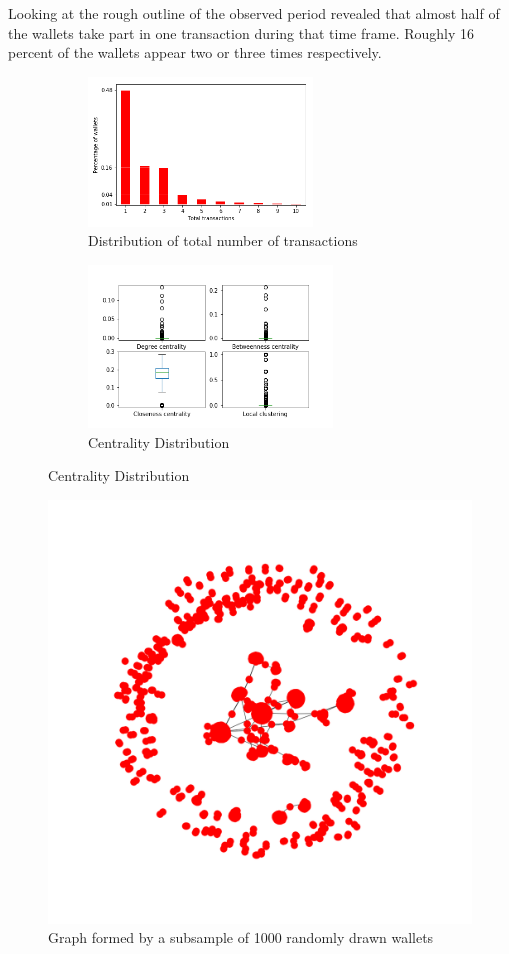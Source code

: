 Looking at the rough outline of the observed period revealed that almost half of the wallets take part in one transaction during that time frame. Roughly 16 percent of the wallets appear two or three times respectively.

\begin{figure}
\centering
\begin{subfigure}[b]{0.5\textwidth}
\includegraphics[height=150px]{../pics/distribution.png}
\caption{Distribution of total number of transactions}
\end{subfigure}%
\begin{subfigure}[b]{0.5\textwidth}
\includegraphics[height=163px]{../analysis/centrality.png}
\caption{Centrality Distribution}
\label{centralitydist}
\end{subfigure}
\end{figure}

\begin{figure}
\centering
\includegraphics[scale=0.49]{../analysis/graph-subsample-1000.png}
\caption{Graph formed by a subsample of 1000 randomly drawn wallets}
\label{graphgraph}
\end{figure}

